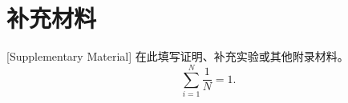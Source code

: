 \chapter{补充材料}[Supplementary Material]
在此填写证明、补充实验或其他附录材料。
\begin{equation}
\sum_{i=1}^{N}\frac{1}{N}=1.
\end{equation}
